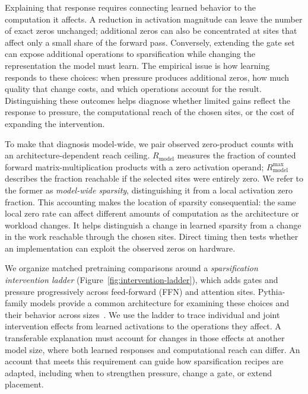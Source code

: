 Explaining that response requires connecting learned behavior to the
computation it affects. A reduction in activation magnitude can leave the
number of exact zeros unchanged; additional zeros can also be concentrated
at sites that affect only a small share of the forward pass. Conversely,
extending the gate set can expose additional operations to sparsification while
changing the representation the model must learn. The empirical issue is how
learning responds to these choices: when pressure produces additional zeros,
how much quality that change costs, and which operations account for the
result. Distinguishing these outcomes helps diagnose whether limited gains
reflect the response to pressure, the computational reach of the chosen sites,
or the cost of expanding the intervention.

To make that diagnosis model-wide, we pair observed zero-product counts with
an architecture-dependent reach ceiling. $R_{\mathrm{model}}$ measures the
fraction of counted forward matrix-multiplication products with a zero
activation operand; $R_{\mathrm{model}}^{\max}$ describes the fraction
reachable if the selected sites were entirely zero. We refer to the former as
\emph{model-wide sparsity}, distinguishing it from a local activation zero
fraction. This accounting makes the location of sparsity consequential: the
same local zero rate can affect different amounts of computation as the
architecture or workload changes. It helps distinguish a change in learned
sparsity from a change in the work reachable through the chosen sites.
Direct timing then tests
whether an implementation can exploit the observed zeros on hardware.

We organize matched pretraining comparisons around a \emph{sparsification
intervention ladder} (Figure~\ref{fig:intervention-ladder}), which adds gates
and pressure progressively across feed-forward (FFN) and attention sites. Pythia-family
models provide a common architecture for examining these choices and their
behavior across sizes~\citep{biderman2023pythia}. We use the ladder to trace
individual and joint intervention effects from learned activations to the
operations they affect. A transferable explanation must account for changes
in those effects at another model size, where both learned responses and
computational reach can differ. An account that meets this requirement can
guide how sparsification recipes are adapted, including when to strengthen
pressure, change a gate, or extend placement.

